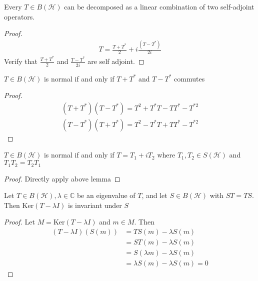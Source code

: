 

\begin{lemma}
  Every $T \in B(\mathcal{H})$ can be decomposed as a linear combination of two
  self-adjoint operators.
\end{lemma}
\begin{proof}
  \begin{align*}
    T = \frac{T+T^*}{2} + i \frac{(T-T^*)}{2i}
  \end{align*}
  Verify that $\frac{T+T^*}{2}$ and $\frac{T-T^*}{2i}$ are self adjoint.
\end{proof}

\begin{lemma}
  $T \in B(\mathcal{H})$ is normal if and only if $T + T^*$ and $T
  - T^*$ commutes
\end{lemma}
\begin{proof}
  \begin{align*}
    (T + T^*)( T - T^*) = T^2 + T^*T - TT^* - T^{*2} \\
    (T - T^*)( T + T^*) = T^2 - T^*T + TT^* - T^{*2}
  \end{align*}
\end{proof}

\begin{lemma}
  $T \in B(\mathcal{H})$ is normal if and only if $T = T_1 + i T_2$
  where $T_{1}, T_{2} \in S(\mathcal{H})$ and $T_{1}T_{2} = T_{2}T_1$
\end{lemma}
\begin{proof}
  Directly apply above lemma
\end{proof}

\begin{lemma}
  \label{CommutingOperatorsPreserveInvariantSpaces}
  Let $T \in B(\mathcal{H}), \lambda \in \mathbb{C}$ be an eigenvalue
  of $T$, and let $ S \in B(\mathcal{H})$ with $ST = TS$. Then $
  \textrm{Ker}(T - \lambda I)$ is invariant under $S$
\end{lemma}
\begin{proof}
  Let $M = \textrm{Ker}(T - \lambda I)$ and $ m \in M$. Then
  \begin{align*}
    (T - \lambda I)(S(m)) &= TS(m) - \lambda S(m) \\
    &= ST(m) - \lambda S(m)\\
    & = S(\lambda m) - \lambda S(m)\\
    &= \lambda S(m) - \lambda S(m) = 0
  \end{align*}
\end{proof}

